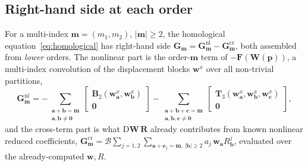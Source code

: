 \subsection{Right-hand side at each order}
For a multi-index $\bm m=(m_1,m_2)$, $|\bm m|\ge2$, the homological
equation~\eqref{eq:homological} has right-hand side
$\bm G_{\bm m}=\bm G^{\mathrm{nl}}_{\bm m}-\bm G^{\mathrm{cr}}_{\bm m}$, both assembled
from \emph{lower} orders. The nonlinear part is the order-$\bm m$ term of
$-\bm F(\bm W(\bm p))$, a multi-index convolution of the displacement blocks
$\bm w^{x}$ over all non-trivial partitions,
\begin{equation}
\bm G^{\mathrm{nl}}_{\bm m}=-\!\!\!\sum_{\substack{\bm a+\bm b=\bm m\\ \bm a,\bm b\ne\bm 0}}\!\!\!
\begin{bmatrix}\bm B_2(\bm w^{x}_{\bm a},\bm w^{x}_{\bm b})\\ \bm 0\end{bmatrix}
-\!\!\!\!\sum_{\substack{\bm a+\bm b+\bm c=\bm m\\ \bm a,\bm b,\bm c\ne\bm 0}}\!\!\!\!
\begin{bmatrix}\bm T_3(\bm w^{x}_{\bm a},\bm w^{x}_{\bm b},\bm w^{x}_{\bm c})\\ \bm 0\end{bmatrix},
\label{eq:app-forcing}
\end{equation}
and the cross-term part is what $\mathrm D\bm W\,\bm R$ already contributes from known
nonlinear reduced coefficients,
$\bm G^{\mathrm{cr}}_{\bm m}=\bm{\mathcal B}\sum_{j=1,2}\sum_{\bm a+\bm e_j=\bm m,\,|\bm b|\ge2}
a_j\,\bm w_{\bm a}R^{j}_{\bm b}$, evaluated over the already-computed $\bm w,R$.

